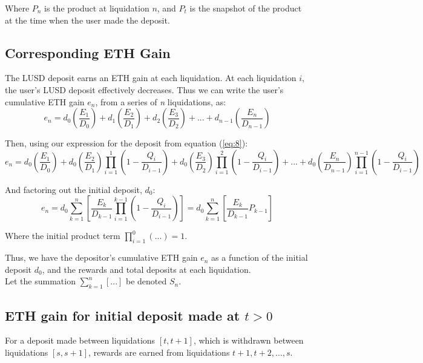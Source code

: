\documentclass[reqno]{article}
\begin{document}
\bigskip
Where $P_n$ is the product at liquidation $n$, and $P_t$ is the snapshot of the product at the time when the user made the deposit.

\bigskip
\subsection{Corresponding ETH Gain}

\bigskip
The LUSD deposit earns an ETH gain at each liquidation.
At each liquidation $i$, the user’s LUSD deposit effectively decreases. Thus we can write the
user’s cumulative ETH gain $e_{n}$, from a series of \textit{n} liquidations, as:
\begin{equation} 
e_n=d_0\left(\frac{E_1}{D_0}\right)+d_1\left(\frac{E_2}{D_1}\right)+d_2\left(\frac{E_3}{D_2}\right)+...+d_{n-1}\left(\frac{E_n}{D_{n-1}}\right)
\end{equation}

\bigskip
Then, using our expression for the deposit from equation (\ref{eq:8}):
\begin{equation} 
e_n=d_0\left(\frac{E_1}{D_0}\right)+d_0\left(\frac{E_2}{D_1}\right)\prod^1_{i=1}\left(1-\frac{Q_i}{D_{i-1}}\right)+d_0\left(\frac{E_3}{D_2}\right)\prod^2_{i=1}\left(1-\frac{Q_i}{D_{i-1}}\right)+...+d_0\left(\frac{E_n}{D_{n-1}}\right)\prod^{n-1}_{i=1}\left(1-\frac{Q_i}{D_{i-1}}\right)
\end{equation}

\bigskip
And factoring out the initial deposit, $d_0$:
\begin{equation} \label{eq:13}
    e_n=d_0\sum^n_{k=1}\left[\frac{E_k}{D_{k-1}}\prod^{k-1}_{i=1}\left(1-\frac{Q_i}{D_{i-1}}\right)\right] = d_0\sum^n_{k=1}\left[\frac{E_k}{D_{k-1}}P_{k-1}\right]
\end{equation}

\bigskip
Where the initial product term $\displaystyle\prod^0_{i=1}(...)=1$.

\bigskip
Thus, we have the depositor's cumulative ETH gain $e_n$ as a function of the initial deposit $d_0$, and the rewards and total deposits at each liquidation.\\
Let the summation $\displaystyle\sum^n_{k=1}[...]$ be denoted $S_n$.

\bigskip
\subsection{ETH gain for initial deposit made at $t>0$}

\bigskip
For a deposit made between liquidations $[t, t+1]$, which is withdrawn between liquidations $[s, s+1]$, rewards are earned from liquidations $t+1, t+2, \ldots, s$.
\end{document}
